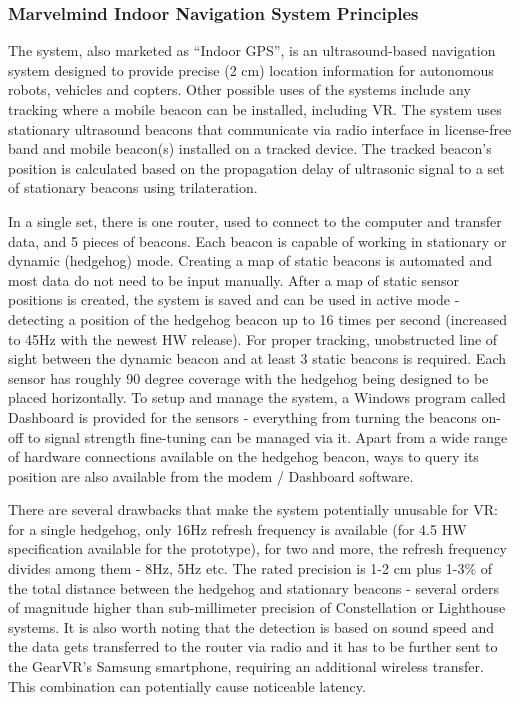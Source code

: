 \documentclass[12pt, a4paper]{article}
\begin{document}
\subsubsection{Marvelmind Indoor Navigation System Principles}
The system, also marketed as “Indoor GPS”, is an ultrasound-based navigation system designed to provide precise (2 cm) location information for autonomous robots, vehicles and copters. Other possible uses of the systems include any tracking where a mobile beacon can be installed, including VR. The system uses stationary ultrasound beacons that communicate via radio interface in license-free band and mobile beacon(s) installed on a tracked device. The tracked beacon’s position is calculated based on the propagation delay of ultrasonic signal to a set of stationary beacons using trilateration.

In a single set, there is one router, used to connect to the computer and transfer data, and 5 pieces of beacons. Each beacon is capable of working in stationary or dynamic (hedgehog) mode. Creating a map of static beacons is automated and most data do not need to be input manually. After a map of static sensor positions is created, the system is saved and can be used in active mode - detecting a position of the hedgehog beacon up to 16 times per second (increased to 45Hz with the newest HW release). For proper tracking, unobstructed line of sight between the dynamic beacon and at least 3 static beacons is required. Each sensor has roughly 90 degree coverage with the hedgehog being designed to be placed horizontally. To setup and manage the system, a Windows program called Dashboard is provided for the sensors - everything from turning the beacons on-off to signal strength fine-tuning can be managed via it. Apart from a wide range of hardware connections available on the hedgehog beacon, ways to query its position are also available from the modem / Dashboard software.

There are several drawbacks that make the system potentially unusable for VR: for a single hedgehog, only 16Hz refresh frequency is available (for 4.5 HW specification available for the prototype), for two and more, the refresh frequency divides among them - 8Hz, 5Hz etc. The rated precision is 1-2 cm plus 1-3\% of the total distance between the hedgehog and stationary beacons - several orders of magnitude higher than sub-millimeter precision of Constellation or Lighthouse systems. It is also worth noting that the detection is based on sound speed and the data gets transferred to the router via radio and it has to be further sent to the GearVR’s Samsung smartphone, requiring an additional wireless transfer. This combination can potentially cause noticeable latency.
\end{document}
